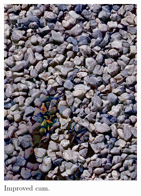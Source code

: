 \begin{figure}[]
\begin{subfigure}{\textwidth}
\begin{subfigure}{0.24\textwidth}
            \includegraphics[width=\textwidth]{images/04-experiment02/human/pebbles/improved_proj.jpg}
            \caption*{Improved cam.}
        \end{subfigure}
        \hfill
        \begin{subfigure}{0.24\textwidth}
            \centering

\end{subfigure}
\end{subfigure}
\end{figure}
